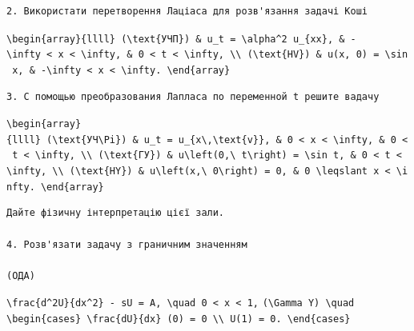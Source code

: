 \documentclass[
  ukrainian,
]{article}
\begin{document}
\begin{verbatim}
2. Використати перетворення Лаціаса для розв'язання задачі Коші
\end{verbatim}

\texttt{\textbackslash{}begin\{array\}\{llll\}\ (\textbackslash{}text\{УЧП\})\ \&\ u\_t\ =\ \textbackslash{}alpha\^{}2\ u\_\{xx\},\ \&\ -\textbackslash{}infty\ \textless{}\ x\ \textless{}\ \textbackslash{}infty,\ \&\ 0\ \textless{}\ t\ \textless{}\ \textbackslash{}infty,\ \textbackslash{}\textbackslash{}\ (\textbackslash{}text\{HV\})\ \&\ u(x,\ 0)\ =\ \textbackslash{}sin\ x,\ \&\ -\textbackslash{}infty\ \textless{}\ x\ \textless{}\ \textbackslash{}infty.\ \textbackslash{}end\{array\}}

\begin{verbatim}
3. С помощью преобразования Лапласа по переменной t решите вадачу
\end{verbatim}

\texttt{\textbackslash{}begin\{array\}\{llll\}\ (\textbackslash{}text\{УЧ\textbackslash{}Pi\})\ \&\ u\_t\ =\ u\_\{x\textbackslash{},\textbackslash{}text\{v\}\},\ \&\ 0\ \textless{}\ x\ \textless{}\ \textbackslash{}infty,\ \&\ 0\ \textless{}\ t\ \textless{}\ \textbackslash{}infty,\ \textbackslash{}\textbackslash{}\ (\textbackslash{}text\{ГУ\})\ \&\ u\textbackslash{}left(0,\textbackslash{}\ t\textbackslash{}right)\ =\ \textbackslash{}sin\ t,\ \&\ 0\ \textless{}\ t\ \textless{}\ \textbackslash{}infty,\ \textbackslash{}\textbackslash{}\ (\textbackslash{}text\{HY\})\ \&\ u\textbackslash{}left(x,\textbackslash{}\ 0\textbackslash{}right)\ =\ 0,\ \&\ 0\ \textbackslash{}leqslant\ x\ \textless{}\ \textbackslash{}infty.\ \textbackslash{}end\{array\}}

\begin{verbatim}
Дайте фізичну інтерпретацію цієї зали.

4. Розв'язати задачу з граничним значенням

(ОДА)
\end{verbatim}

\texttt{\textbackslash{}frac\{d\^{}2U\}\{dx\^{}2\}\ -\ sU\ =\ A,\ \textbackslash{}quad\ 0\ \textless{}\ x\ \textless{}\ 1,}
\texttt{(\textbackslash{}Gamma\ Y)\ \textbackslash{}quad}
\texttt{\textbackslash{}begin\{cases\}\ \textbackslash{}frac\{dU\}\{dx\}\ (0)\ =\ 0\ \textbackslash{}\textbackslash{}\ U(1)\ =\ 0.\ \textbackslash{}end\{cases\}}
\end{document}
